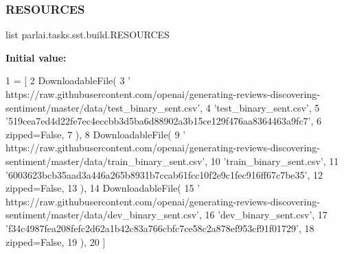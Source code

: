 \subsubsection{\texorpdfstring{R\+E\+S\+O\+U\+R\+C\+ES}{RESOURCES}}
{\footnotesize\ttfamily list parlai.\+tasks.\+sst.\+build.\+R\+E\+S\+O\+U\+R\+C\+ES}

{\bfseries Initial value\+:}
\begin{DoxyCode}
1 =  [
2     DownloadableFile(
3         \textcolor{stringliteral}{'
      https://raw.githubusercontent.com/openai/generating-reviews-discovering-sentiment/master/data/test\_binary\_sent.csv'},
4         \textcolor{stringliteral}{'test\_binary\_sent.csv'},
5         \textcolor{stringliteral}{'519cea7ed4d22fe7ec4eccbb3d5ba6d88902a3b15ce129f476aa8364463a9fc7'},
6         zipped=\textcolor{keyword}{False},
7     ),
8     DownloadableFile(
9         \textcolor{stringliteral}{'
      https://raw.githubusercontent.com/openai/generating-reviews-discovering-sentiment/master/data/train\_binary\_sent.csv'},
10         \textcolor{stringliteral}{'train\_binary\_sent.csv'},
11         \textcolor{stringliteral}{'6003623bcb35aad3a446a265b8931b7ccab61fcc10f2e9c1fec916ff67c7be35'},
12         zipped=\textcolor{keyword}{False},
13     ),
14     DownloadableFile(
15         \textcolor{stringliteral}{'
      https://raw.githubusercontent.com/openai/generating-reviews-discovering-sentiment/master/data/dev\_binary\_sent.csv'},
16         \textcolor{stringliteral}{'dev\_binary\_sent.csv'},
17         \textcolor{stringliteral}{'f34c4987fea208fefc2d62a1b42c83a766cbfc7ce58c2a878ef953cf91f01729'},
18         zipped=\textcolor{keyword}{False},
19     ),
20 ]
\end{DoxyCode}
